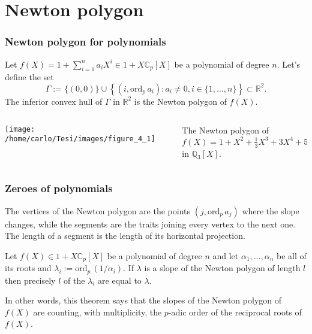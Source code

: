 \documentclass{beamer}
\newcommand{\Q}{ \mathbb{Q} }
\newcommand{\R}{ \mathbb{R} }
\newcommand{\C}{ \mathbb{C} }
\newcommand{\Cp}{ \C_p }
\newcommand{\padic}{$p$-adic }
\newcommand{\ord}{ \textrm{ord}_p\, }  %
\theoremstyle{plain}
\begin{document}
	\section{Newton polygon}
	\begin{frame}
		\frametitle{Newton polygon for polynomials}
		\begin{definition}
			Let $f(X) = 1 + \sum_{i=1}^n a_iX^i \in 1 + X\Cp[X]$ be a polynomial of degree $n$. Let's define the set
			\[
				\Gamma := \{(0, 0)\} \cup \left\{(i, \ord a_i) : a_i \neq 0, i \in \{1, \dots, n\} \right\} \subset \R^2.
			\]
			The inferior convex hull of $\Gamma$ in $\R^2$ is the \alert{Newton polygon} of $f(X)$.
		\end{definition}
		\pause
		\begin{columns}
			\begin{column}{0.5\textwidth}
				\texttt{[image: /home/carlo/Tesi/images/figure\_4\_1]}
			\end{column}
			\begin{column}{0.5\textwidth}
				The Newton polygon of 
				\[
					f(X) = 1 + X^2 + \tfrac{1}{3}X^3 + 3X^4 + 54X^5
				\]
				in $\Q_3[X]$.
			\end{column}
		\end{columns}
	\end{frame}
	\begin{frame}
		\frametitle{Zeroes of polynomials}
		\begin{definition}
			The \alert{vertices} of the Newton polygon are the points $(j, \ord a_j)$ where the slope changes, while the \alert{segments} are the traits joining every vertex to the next one. The length of a segment is the length of its horizontal projection.
		\end{definition}
		\pause
		\begin{theorem}
			Let $f(X) \in 1 + X\Cp[X]$ be a polynomial of degree $n$ and let $\alpha_1, \dots, \alpha_n$ be all of its roots and $\lambda_i := \mathrm{ord}_p\,(1/\alpha_i)$. If $\lambda$ is a slope of the Newton polygon of length $l$ then precisely $l$ of the $\lambda_i$ are equal to $\lambda$.
		\end{theorem}
		In other words, this theorem says that the slopes of the Newton polygon of $f(X)$ are counting, with multiplicity, the \padic order of the reciprocal roots of $f(X)$.
	\end{frame}
\end{document}
